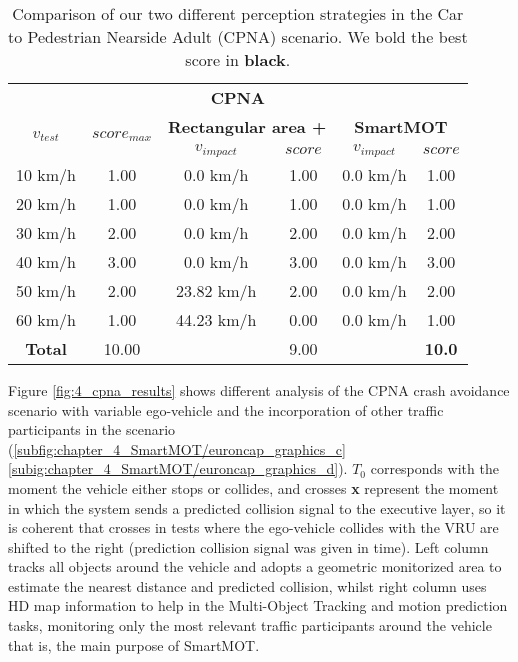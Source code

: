 \begin{table}[h]
	\centering
	\captionsetup{justification=justified}
	\caption{Comparison of our two different perception strategies in the Car to Pedestrian Nearside Adult (CPNA) scenario. We bold the best score in \textbf{black}.}
	\label{table:4_CPNA_results}
	\begin{tabular}{c | c | c  c | c  c  } 
		\toprule 
		\multicolumn{6}{c}{\textbf{CPNA}}\\
		\multirow{2}{*}{\textbf{\(v_{test}\)}} & \multirow{2}{*}{\textbf{\(score_{max}\)}} & \multicolumn{2}{c}{\textbf{Rectangular area + \cite{gomez2020real}}} & \multicolumn{2}{c}{\textbf{SmartMOT}} \\ 
		& & \(v_{impact}\) & \(score\) & \(v_{impact}\) & \(score\) \\
		\midrule
		10 km/h & 1.00 & 0.0 km/h & 1.00 & 0.0 km/h & 1.00 \\
		20 km/h & 1.00 & 0.0 km/h & 1.00 & 0.0 km/h & 1.00 \\
		30 km/h & 2.00 & 0.0 km/h & 2.00 & 0.0 km/h & 2.00 \\
		40 km/h & 3.00 & 0.0 km/h & 3.00 & 0.0 km/h & 3.00 \\
		50 km/h & 2.00 & 23.82 km/h & 2.00 & 0.0 km/h & 2.00 \\
		60 km/h & 1.00 & 44.23 km/h & 0.00 & 0.0 km/h & 1.00  \\
		\midrule
		\textbf{Total} & 10.00 &  & 9.00 & & \textbf{10.0} \\
		\bottomrule
	\end{tabular}
\end{table}

Figure \ref{fig:4_cpna_results} shows different analysis of the CPNA crash avoidance scenario with variable ego-vehicle and the incorporation of other traffic participants in the scenario (\ref{subfig:chapter_4_SmartMOT/euroncap_graphics_c} \ref{subig:chapter_4_SmartMOT/euroncap_graphics_d}). \(T_0\) corresponds with the moment the vehicle either stops or collides, and crosses \textbf{x} represent the moment in which the system sends a predicted collision signal to the executive layer, so it is coherent that crosses in tests where the ego-vehicle collides with the VRU are shifted to the right (prediction collision signal was given in time). Left column tracks all objects around the vehicle and adopts a geometric monitorized area to estimate the nearest distance and predicted collision, whilst right column uses HD map information to help in the Multi-Object Tracking and motion prediction tasks, monitoring only the most relevant traffic participants around the vehicle that is, the main purpose of SmartMOT.

